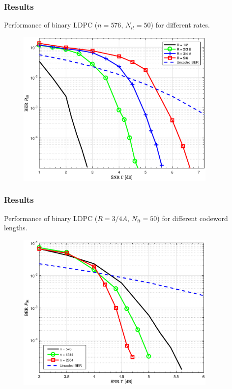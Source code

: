 \documentclass[]{beamer}
\begin{document}
\begin{frame}
\transwipe[direction=0]
\frametitle{Results}
Performance of binary LDPC ($n = 576$, $N_{it} = 50$) for different rates.
\begin{center}
\begin{figure}
\includegraphics[width=9.8cm, trim={0 0 0 0.3cm},clip]{figure1/r}
\end{figure}
\end{center}

\end{frame}

\begin{frame}
\transwipe[direction=0]
\frametitle{Results}
Performance of binary LDPC ($R = 3/4 A$, $N_{it} = 50$) for different codeword lengths.
\begin{center}
\begin{figure}
\includegraphics[width=9.8cm, trim={0 0 0 0.9cm},clip]{figure1/n}
\end{figure}
\end{center}
\end{frame}
\end{document}
